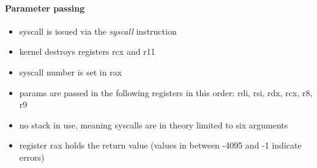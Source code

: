 \paragraph{Parameter passing}

\begin{itemize}
\item syscall is issued via the {\em syscall} instruction
\item kernel destroys registers rcx and r11
\item syscall number is set in rax
\item params are passed in the following registers in this order: rdi, rsi, rdx, rcx, r8, r9
\item no stack in use, meaning syscalls are in theory limited to six arguments
\item register rax holds the return value (values in between -4095 and -1 indicate errors)
\end{itemize}


